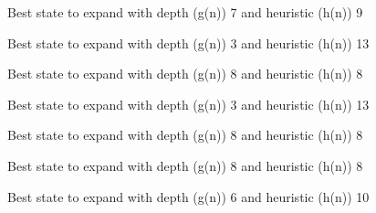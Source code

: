 \documentclass{article}
\begin{document}
{\noindent Best state to expand with depth (g(n)) 7 and heuristic (h(n)) 9\newline}
{}\newline

{\noindent Best state to expand with depth (g(n)) 3 and heuristic (h(n)) 13\newline}
{}\newline

{\noindent Best state to expand with depth (g(n)) 8 and heuristic (h(n)) 8\newline}
{}\newline

{\noindent Best state to expand with depth (g(n)) 3 and heuristic (h(n)) 13\newline}
{}\newline

{\noindent Best state to expand with depth (g(n)) 8 and heuristic (h(n)) 8\newline}
{}\newline

{\noindent Best state to expand with depth (g(n)) 8 and heuristic (h(n)) 8\newline}
{}\newline

{\noindent Best state to expand with depth (g(n)) 6 and heuristic (h(n)) 10\newline}
{}\newline
\end{document}
